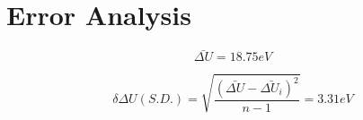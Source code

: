 \section{Error Analysis}

    

    $$\bar{\Delta U} = 18.75 eV$$

    $$\delta\Delta U (S.D.) = \sqrt{\frac{(\bar{\Delta U}-\bar{\Delta U_i})^2}{n-1}} = 3.31eV$$